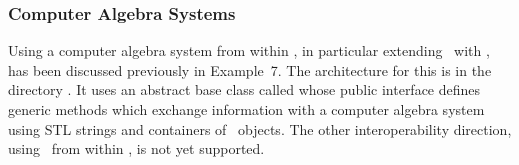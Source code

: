 \subsubsection{Computer Algebra Systems}
Using a computer algebra system from within \efloat, in particular
extending \efloat\ with \mathematica, has
been discussed previously in Example~7.
The architecture for this is in the directory
{}. It uses an abstract base class called
{} whose public interface
defines generic methods which exchange information with a
computer algebra system using STL strings and containers of \efloatclass\ objects.
The other interoperability direction,
using \efloat\ from within \mathematica, is not yet supported.
